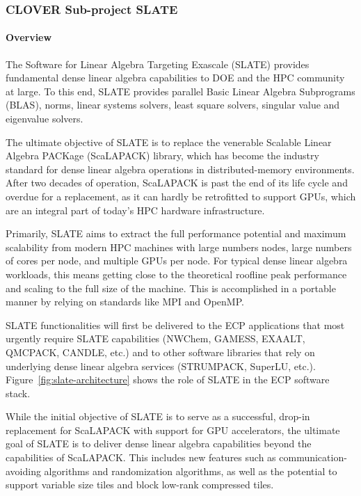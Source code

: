 \subsubsection{CLOVER Sub-project SLATE}\label{subsubsect:slate}

\paragraph{Overview}

The Software for Linear Algebra Targeting Exascale (SLATE)
provides fundamental dense linear algebra capabilities
to DOE and the HPC community at large.
To this end, SLATE provides
parallel Basic Linear Algebra Subprograms (BLAS), norms,
linear systems solvers, least square solvers,
singular value and eigenvalue solvers.

The ultimate objective of SLATE is to replace the
venerable Scalable Linear Algebra PACKage (ScaLAPACK) library,
which has become the industry standard for dense linear algebra operations
in distributed-memory environments.
After two decades of operation,
ScaLAPACK is past the end of its life cycle and overdue for a replacement,
as it can hardly be retrofitted to support GPUs,
which are an integral part of today's HPC hardware infrastructure.

Primarily, SLATE aims to extract the full performance potential and maximum
scalability from modern HPC machines with large numbers nodes,
large numbers of cores per node, and multiple GPUs per node.
For typical dense linear algebra workloads, this means getting close
to the theoretical roofline peak performance and scaling to the full size of
the machine.
This is accomplished in a portable manner by relying on standards
like MPI and OpenMP.

SLATE functionalities will first be delivered to the ECP applications
that most urgently require SLATE capabilities
(NWChem, GAMESS, EXAALT, QMCPACK, CANDLE, etc.)
and to other software libraries
that rely on underlying dense linear algebra services
(STRUMPACK, SuperLU, etc.).
Figure~\ref{fig:slate-architecture} shows the role of SLATE
in the ECP software stack.

While the initial objective of SLATE is to serve as a successful,
drop-in replacement for ScaLAPACK with support for GPU accelerators,
the ultimate goal of SLATE is to deliver dense linear algebra capabilities
beyond the capabilities of ScaLAPACK.
This includes new features such as communication-avoiding
algorithms and randomization algorithms, as well as the potential to
support variable size tiles and block low-rank compressed tiles.


